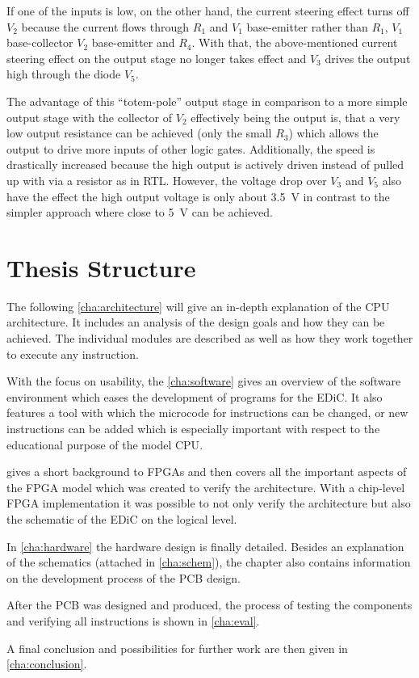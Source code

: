 If one of the inputs is low, on the other hand, the current steering effect turns off $V_2$ because the current flows through $R_1$ and $V_1$ base-emitter rather than $R_1$, $V_1$ base-collector $V_2$ base-emitter and $R_4$.
With that, the above-mentioned current steering effect on the output stage no longer takes effect and $V_3$ drives the output high through the diode $V_5$.

The advantage of this ``totem-pole'' output stage in comparison to a more simple output stage with the collector of $V_2$ effectively being the output is, that a very low output resistance can be achieved (only the small $R_3$) which allows the output to drive more inputs of other logic gates.
Additionally, the speed is drastically increased because the high output is actively driven instead of pulled up with via a resistor as in \gls{RTL}.
However, the voltage drop over $V_3$ and $V_5$ also have the effect the high output voltage is only about \qty{3.5}{\volt} in contrast to the simpler approach where close to \qty{5}{\volt} can be achieved.


\section{Thesis Structure}
The following \cref{cha:architecture} will give an in-depth explanation of the \gls{CPU} architecture.
It includes an analysis of the design goals and how they can be achieved.
The individual modules are described as well as how they work together to execute any instruction.

With the focus on usability, the \cref{cha:software} gives an overview of the software environment which eases the development of programs for the \gls{EDiC}.
It also features a tool with which the microcode for instructions can be changed, or new instructions can be added which is especially important with respect to the educational purpose of the model \gls{CPU}.

 gives a short background to \glspl{FPGA} and then covers all the important aspects of the \gls{FPGA} model which was created to verify the architecture.
With a chip-level \gls{FPGA} implementation it was possible to not only verify the architecture but also the schematic of the \gls{EDiC} on the logical level.

In \cref{cha:hardware} the hardware design is finally detailed.
Besides an explanation of the schematics (attached in \cref{cha:schem}), the chapter also contains  information on the development process of the \gls{PCB} design.

After the \gls{PCB} was designed and produced, the process of testing the components and verifying all instructions is shown in \cref{cha:eval}.

A final conclusion and possibilities for further work are then given in \cref{cha:conclusion}.
